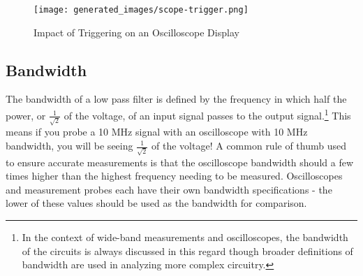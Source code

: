 \documentclass[main.tex]{subfiles}
\begin{document}
\begin{figure}[H]
    \centering
    \texttt{[image: generated\_images/scope-trigger.png]}
    \caption{Impact of Triggering on an Oscilloscope Display}
    \label{fig:scope-triggering}
\end{figure}

\subsection{Bandwidth}
The bandwidth of a low pass filter is defined by the frequency in which half the power, or $\frac{1}{\sqrt{2}}$ of the voltage, of an input signal passes to the output signal.\footnote{In the context of wide-band measurements and oscilloscopes, the bandwidth of the circuits is always discussed in this regard though broader definitions of bandwidth are used in analyzing more complex circuitry.}
This means if you probe a 10 MHz signal with an oscilloscope with 10 MHz bandwidth, you will be seeing $\frac{1}{\sqrt{2}}$ of the voltage! A common rule of thumb used to ensure accurate measurements is that the oscilloscope bandwidth should a few times higher than the highest frequency needing to be measured. Oscilloscopes and measurement probes each have their own bandwidth specifications - the lower of these values should be used as the bandwidth for comparison. \newline


\end{document}
